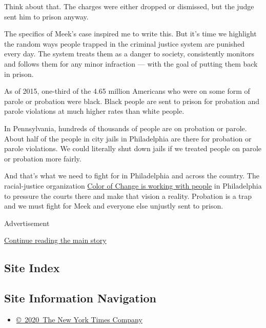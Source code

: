 Think about that. The charges were either dropped or dismissed, but the
judge sent him to prison anyway.

The specifics of Meek's case inspired me to write this. But it's time we
highlight the random ways people trapped in the criminal justice system
are punished every day. The system treats them as a danger to society,
consistently monitors and follows them for any minor infraction --- with
the goal of putting them back in prison.

As of 2015, one-third of the 4.65 million Americans who were on some
form of parole or probation were black. Black people are sent to prison
for probation and parole violations at much higher rates than white
people.

In Pennsylvania, hundreds of thousands of people are on probation or
parole. About half of the people in city jails in Philadelphia are there
for probation or parole violations. We could literally shut down jails
if we treated people on parole or probation more fairly.

And that's what we need to fight for in Philadelphia and across the
country. The racial-justice organization
\href{http://freemeekmill.org/}{Color of Change is working with people}
in Philadelphia to pressure the courts there and make that vision a
reality. Probation is a trap and we must fight for Meek and everyone
else unjustly sent to prison.

Advertisement

\protect\hyperlink{after-bottom}{Continue reading the main story}

\hypertarget{site-index}{%
\subsection{Site Index}\label{site-index}}

\hypertarget{site-information-navigation}{%
\subsection{Site Information
Navigation}\label{site-information-navigation}}

\begin{itemize}
\tightlist
\item
  \href{https://help.nytimes3xbfgragh.onion/hc/en-us/articles/115014792127-Copyright-notice}{©~2020~The
  New York Times Company}
\end{itemize}

